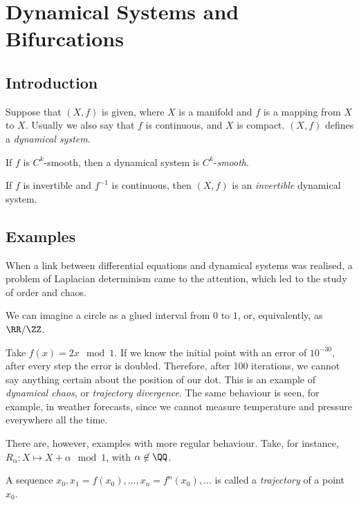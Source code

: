\documentclass[11pt]{scrartcl}
\begin{document}
\section{Dynamical Systems and Bifurcations}

\subsection{Introduction}

Suppose that $(X, f)$ is given, where $X$ is a manifold and $f$ is a
mapping from $X$ to $X$. Usually we also say that $f$ is continuous,
and $X$ is compact. $(X, f)$ defines a \textit{dynamical system}.

If $f$ is $C^{k}$-smooth, then a dynamical system is $C^{k}$-\textit{smooth}.

If $f$ is invertible and $f^{-1}$ is continuous, then $(X, f)$ is an
\textit{invertible} dynamical system.

\subsection{Examples}
\begin{example}

  When a link between differential equations and dynamical systems was
  realised, a problem of Laplacian determinism came to the attention,
  which led to the study of order and chaos.

  We can imagine a circle as a glued interval from $0$ to $1$, or,
  equivalently, as $\RR / \ZZ$.

  Take $f(x) = 2x \mod 1$. If we know the initial point with an error
  of $10^{-30}$, after every step the error is doubled. Therefore,
  after 100 iterations, we cannot say anything certain about the
  position of our dot. This is an example of \textit{dynamical chaos},
  or \textit{trajectory divergence}. The same behaviour is seen, for
  example, in weather forecasts, since we cannot measure temperature
  and pressure everywhere all the time.

  There are, however, examples with more regular behaviour. Take, for
  instance, $R_{\alpha}: X \mapsto X + \alpha \mod 1$, with
  $\alpha \not\in \QQ$.

\end{example}

\begin{definition}
  A sequence
  $x_{0}, x_{1} = f(x_{0}), \dots, x_{n} = f^{n}(x_{0}), \dots$ is
  called a \textit{trajectory} of a point $x_{0}$.
\end{definition}
\end{document}
